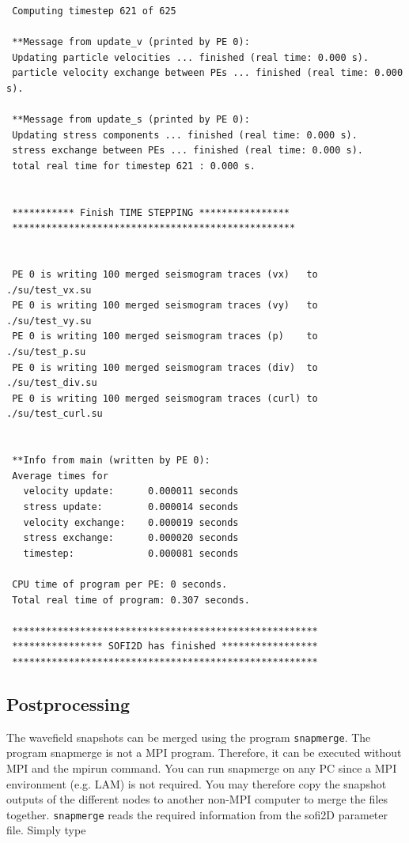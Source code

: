 \documentclass[11pt,onecolumn,oneside]{article}
\begin{document}
\begin{verbatim}
 Computing timestep 621 of 625

 **Message from update_v (printed by PE 0):
 Updating particle velocities ... finished (real time: 0.000 s).
 particle velocity exchange between PEs ... finished (real time: 0.000 s).

 **Message from update_s (printed by PE 0):
 Updating stress components ... finished (real time: 0.000 s).
 stress exchange between PEs ... finished (real time: 0.000 s).
 total real time for timestep 621 : 0.000 s.


 *********** Finish TIME STEPPING ****************
 **************************************************


 PE 0 is writing 100 merged seismogram traces (vx)   to  ./su/test_vx.su
 PE 0 is writing 100 merged seismogram traces (vy)   to  ./su/test_vy.su
 PE 0 is writing 100 merged seismogram traces (p)    to  ./su/test_p.su
 PE 0 is writing 100 merged seismogram traces (div)  to  ./su/test_div.su
 PE 0 is writing 100 merged seismogram traces (curl) to  ./su/test_curl.su


 **Info from main (written by PE 0):
 Average times for
   velocity update:      0.000011 seconds
   stress update:        0.000014 seconds
   velocity exchange:    0.000019 seconds
   stress exchange:      0.000020 seconds
   timestep:             0.000081 seconds

 CPU time of program per PE: 0 seconds.
 Total real time of program: 0.307 seconds.

 ******************************************************
 **************** SOFI2D has finished *****************
 ******************************************************
\end{verbatim}  

\subsection{Postprocessing}

The wavefield snapshots can be merged using the program \texttt{snapmerge}. The program snapmerge is not a MPI program. Therefore, it can be executed without MPI and the mpirun command. You can run snapmerge on any PC since a MPI environment (e.g. LAM) is not required. You may therefore copy the snapshot outputs of the different nodes to another non-MPI computer to merge the files together. \texttt{snapmerge} reads the required information from the sofi2D parameter file. Simply type
\end{document}
